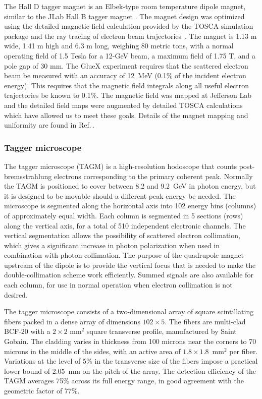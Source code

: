 The Hall D tagger magnet is an Elbek-type room temperature dipole magnet, similar
to the JLab Hall B tagger magnet \cite{BORGGREEN19631, Sober2000263}. The magnet
design was optimized using the detailed magnetic field calculation  provided by the
TOSCA simulation package and the ray tracing of electron beam trajectories~\cite{DIPOLE_YANG,DIPOLE_SOMOV}.
The magnet is 1.13 m wide, 1.41 m high and 6.3 m long, weighing 80 metric tons,
with a normal operating field of 1.5 Tesla for a  12-GeV beam, a maximum field of
1.75 T, and a pole gap of 30 mm. The GlueX experiment requires that the scattered
electron beam be measured with an accuracy of 12~MeV (0.1\% of the incident electron
energy). This requires that the magnetic field integrals along all useful electron
trajectories be known to 0.1\%. The magnetic field was mapped at Jefferson Lab and
the detailed field maps were augmented by detailed TOSCA calculations which have
allowed us to meet these goals. Details of the magnet mapping and uniformity are
found in Ref.\,\cite{gx4271}.

\subsubsection{Tagger microscope}\label{sec:TAGM}
The tagger microscope (TAGM) is a high-resolution hodoscope that counts post-brems\-strah\-lung
electrons corresponding to the primary coherent peak. Normally the TAGM is positioned
to cover between 8.2 and 9.2~GeV in photon energy, but it is designed to be movable should a
different peak energy be needed. The microscope is segmented along the horizontal axis into
102 energy bins (columns) of approximately equal width. Each column is segmented 
in 5 sections (rows) along the vertical axis, for a total of 510 independent electronic
channels. The vertical segmentation allows the possibility of scattered electron
collimation, which gives a significant increase in photon polarization when used in
combination with photon collimation. The purpose of the quadrupole magnet upstream
of the dipole is to provide the vertical focus that is needed to make the
double-collimation scheme work efficiently. Summed signals are also available for
each column, for use in normal operation when electron collimation is not desired.

The tagger microscope consists of a two-dimensional array of square scintillating
fibers packed in a dense array of dimensions $102\times 5$. The fibers are multi-clad
BCF-20 with a $2\times 2$ mm$^2$ square transverse profile, manufactured by Saint Gobain.
The cladding varies in thickness from 100 microns near the corners to 70 microns in
the middle of the sides, with an active area of $1.8\times 1.8$~mm$^2$ per fiber.
Variations at the level of 5\% in the transverse size of the fibers impose a practical
lower bound of 2.05~mm on the pitch of the array. The detection efficiency of the TAGM
averages 75\% across its full energy range, in good agreement with the geometric
factor of 77\%.

